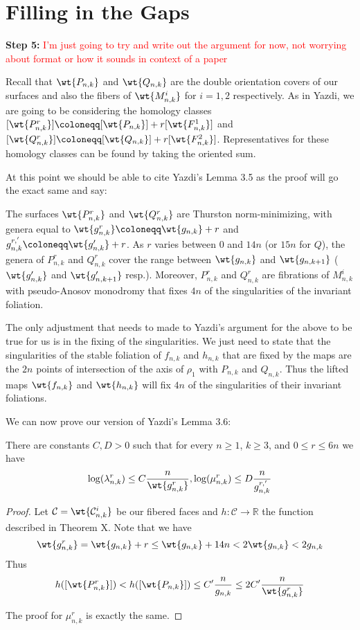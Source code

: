 \section{Filling in the Gaps}

\textbf{Step 5:}
\textcolor{red}{I'm just going to try and write out the argument for now, not worrying about format or how it sounds in context of a paper}

Recall that $\wt{P_{n,k}}$ and $\wt{Q_{n,k}}$ are the double orientation covers of our surfaces and also the fibers of $\wt{M^i_{n,k}}$ for $i = 1,2$ respectively. As in Yazdi, we are going to be considering the homology classes $[\wt{P^r_{n,k}}] \coloneqq [\wt{P_{n,k}}] + r[\wt{F^1_{n,k}}]$ and $[\wt{Q^r_{n,k}}] \coloneqq [\wt{Q_{n,k}}] + r[\wt{F^2_{n,k}}]$. Representatives for these homology classes can be found by taking the oriented sum.

At this point we should be able to cite Yazdi's Lemma 3.5 as the proof will go the exact same and say:

\begin{lem}
The surfaces $\wt{P^r_{n,k}}$ and $\wt{Q^r_{n,k}}$ are Thurston norm-minimizing, with genera equal to $\wt{g^r_{n,k}} \coloneqq \wt{g_{n,k}} + r$ and $g^{r,'}_{n,k} \coloneqq \wt{g'_{n,k}} + r$. As $r$ varies between $0$ and $14n$ (or $15n$ for $Q$), the genera of $P^r_{n,k}$ and $Q^r_{n,k}$ cover the range between $\wt{g_{n,k}}$ and $\wt{g_{n,k+1}}$ ($\wt{g'_{n,k}}$ and $\wt{g'_{n,k+1}}$ resp.). Moreover, $P^r_{n,k}$ and $Q^r_{n,k}$ are fibrations of $M^i_{n,k}$ with pseudo-Anosov monodromy that fixes $4n$ of the singularities of the invariant foliation.
\end{lem}

The only adjustment that needs to made to Yazdi's argument for the above to be true for us is in the fixing of the singularities. We just need to state that the singularities of the stable foliation of $f_{n,k}$ and $h_{n,k}$ that are fixed by the maps are the $2n$ points of intersection of the axis of $\rho_1$ with $P_{n,k}$ and $Q_{n,k}$. Thus the lifted maps $\wt{f_{n,k}}$ and $\wt{h_{n,k}}$ will fix $4n$ of the singularities of their invariant foliations.

We can now prove our version of Yazdi's Lemma 3.6:

\begin{lem}
There are constants $C,D > 0$ such that for every $n \geq 1$, $k \geq 3$, and $0 \leq r \leq 6n$ we have $$\log(\lambda^r_{n,k}) \leq C\frac{n}{\wt{g^r_{n,k}}}, \vspace{1em} \log(\mu^r_{n,k}) \leq D\frac{n}{g^{r,'}_{n,k}}$$
\end{lem}
\begin{proof}
    Let $\mathcal{C} = \wt{\mathcal{C}^i_{n,k}}$ be our fibered faces and $h: \mathcal{C} \xrightarrow[]{} \mathbb{R}$ the function described in Theorem X. Note that we have 
    $$\wt{g^r_{n,k}} = \wt{g_{n,k}} + r \leq \wt{g_{n,k}} + 14n < 2\wt{g_{n,k}} < 2g_{n,k}$$
    Thus
    $$h([\wt{P^r_{n,k}}]) < h([\wt{P_{n,k}}]) \leq C'\frac{n}{g_{n,k}} \leq 2C'\frac{n}{\wt{g^r_{n,k}}} $$
    
    The proof for $\mu^r_{n,k}$ is exactly the same.
\end{proof}

